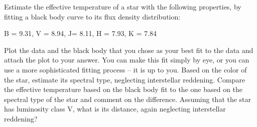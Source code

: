 \documentclass[12pt]{article}
\newenvironment{problem}[2][Problem]{\begin{trivlist}
\item[\hskip \labelsep {\bfseries #1}\hskip \labelsep {\bfseries #2.}]}{\end{trivlist}}
\begin{document}
\bigskip \bigskip
\begin{problem}{2}
  Estimate the effective temperature of a star with the following properties, by fitting a black body curve to its flux density distribution:

  \bigskip
  \centerline {B = 9.31, V = 8.94, J= 8.11, H = 7.93, K = 7.84}
  \bigskip

  \noindent Plot the data and the black body that you chose as your best fit to the data and attach the plot to your answer. You can make this fit simply by eye, or you can use a more sophisticated fitting process -- it is up to you. Based on the color of the star, estimate its spectral type, neglecting interstellar reddening. Compare the effective temperature based on the black body fit to the one based on the spectral type of the star and comment on the difference. Assuming that the star has luminosity class V, what is its distance, again neglecting interstellar reddening?
\end{problem}
\end{document}
